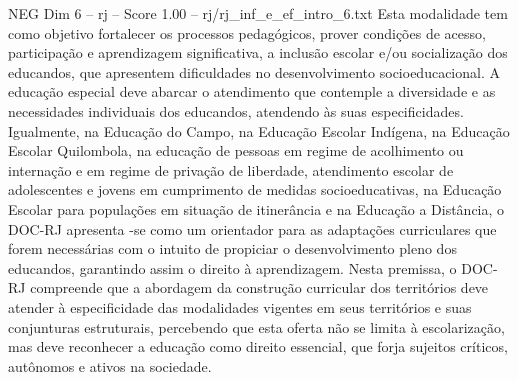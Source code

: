 \begin{textsample}{NEG Dim 6 – rj – Score 1.00 – rj/rj\_inf\_e\_ef\_intro\_6.txt}
Esta modalidade tem como objetivo fortalecer os processos pedagógicos, prover condições de acesso, participação e aprendizagem significativa, a inclusão escolar e/ou socialização dos educandos, que apresentem dificuldades no desenvolvimento socioeducacional.
A educação especial deve abarcar o atendimento que contemple a diversidade e as necessidades individuais dos educandos, atendendo às suas especificidades.
Igualmente, na Educação do Campo, na Educação Escolar Indígena, na Educação Escolar Quilombola, na educação de pessoas em regime de acolhimento ou internação e em regime de privação de liberdade, atendimento escolar de adolescentes e jovens em cumprimento de medidas socioeducativas, na Educação Escolar para populações em situação de itinerância e na Educação a Distância, o DOC-RJ apresenta -se como um orientador para as adaptações curriculares que forem necessárias com o intuito de propiciar o desenvolvimento pleno dos educandos, garantindo assim o direito à aprendizagem.
Nesta premissa, o DOC-RJ compreende que a abordagem da construção curricular dos territórios deve atender à especificidade das modalidades vigentes em seus territórios e suas conjunturas estruturais, percebendo que esta oferta não se limita à escolarização, mas deve reconhecer a educação como direito essencial, que forja sujeitos críticos, autônomos e ativos na sociedade.

\end{textsample}
